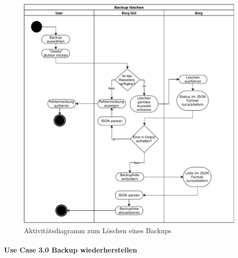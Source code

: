 \begin{figure}[htbp]
\centering
\includegraphics[width=.9\linewidth]{pictures/activity_delete.pdf}
\caption{\label{fig:org288e5d3}
Aktivitätsdiagramm zum Löschen eines Backups}
\end{figure}

\newpage
\paragraph{Use Case 3.0 Backup wiederherstellen}
\label{sec:org8be05c9}

